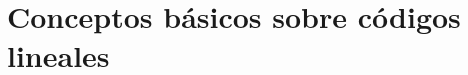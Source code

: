\section{Conceptos básicos sobre códigos lineales}%
\label{sec:conceptos_básicos_sobre_códigos_lineales}
